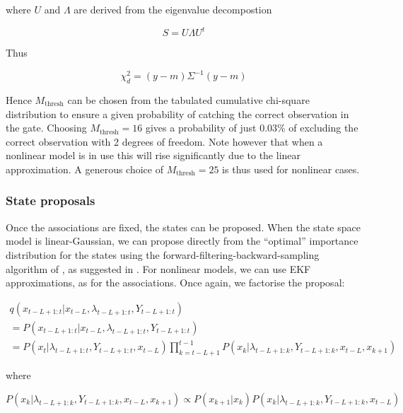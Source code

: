 where $U$ and $\Lambda$ are derived from the eigenvalue decompostion

\begin{equation}
S = U \Lambda U^t
\end{equation}

Thus

\begin{equation}
\chi_d^2 = (y-m) \Sigma^{-1} (y-m)
\end{equation}

Hence $M_{\text{thresh}}$ can be chosen from the tabulated cumulative chi-square distribution to ensure a given probability of catching the correct observation in the gate. Choosing $M_{\text{thresh}}=16$ gives a probability of just 0.03\% of excluding the correct observation with 2 degrees of freedom. Note however that when a nonlinear model is in use this will rise significantly due to the linear approximation. A generous choice of $M_{\text{thresh}}=25$ is thus used for nonlinear cases.



\subsubsection{State proposals}

Once the associations are fixed, the states can be proposed. When the state space model is linear-Gaussian, we can propose directly from the ``optimal'' importance distribution for the states using the forward-filtering-backward-sampling algorithm of \cite{Chib1996}, as suggested in \cite{Doucet2006}. For nonlinear models, we can use EKF approximations, as for the associations. Once again, we factorise the proposal:

\begin{multline}
q(x_{t-L+1:t}|x_{t-L}, \lambda_{t-L+1:t}, Y_{t-L+1:t}) \\
= P(x_{t-L+1:t}|x_{t-L}, \lambda_{t-L+1:t}, Y_{t-L+1:t}) \\
= P(x_t|\lambda_{t-L+1:t}, Y_{t-L+1:t}, x_{t-L}) \prod_{k=t-L+1}^{t-1} P(x_k|\lambda_{t-L+1:k}, Y_{t-L+1:k}, x_{t-L}, x_{k+1})
\label{eq:}
\end{multline}

where

\begin{equation}
P(x_k|\lambda_{t-L+1:k}, Y_{t-L+1:k}, x_{t-L}, x_{k+1}) \propto P(x_{k+1}|x_k) P(x_k|\lambda_{t-L+1:k}, Y_{t-L+1:k}, x_{t-L})
\label{eq:}
\end{equation}

